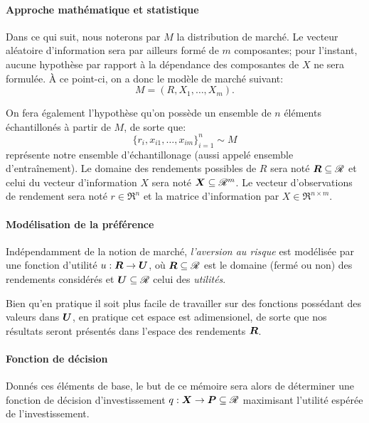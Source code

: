\paragraph{Approche mathématique et statistique}

Dans ce qui suit, nous noterons par $M$ la distribution de marché. Le vecteur aléatoire
d'information sera par ailleurs formé de $m$ composantes; pour l'instant, aucune hypothèse
par rapport à la dépendance des composantes de $X$ ne sera formulée. À ce point-ci, on a
donc le modèle de marché suivant:
\begin{equation}
  M = (R,X_1, \ldots, X_m).
\end{equation}

On fera également l'hypothèse qu'on possède un ensemble de $n$ éléments échantillonés à
partir de $M$, de sorte que:
\begin{equation}
  \{r_i, x_{i1}, \ldots, x_{im}\}_{i=1}^n \sim M
\end{equation}
représente notre ensemble d'échantillonage (aussi appelé ensemble d'entraînement). Le
domaine des rendements possibles de $R$ sera noté $\bm{R} \subseteq \mathscr{R}$ et celui du vecteur
d'information $X$ sera noté $\bm{X} \subseteq \mathscr{R}^m$. Le vecteur d'observations de rendement sera noté
$r \in \Re^n$ et la matrice d'information par $X \in \Re^{n \times m}$.



\paragraph{Modélisation de la préférence}

Indépendamment de la notion de marché, \textit{l'aversion au risque} est modélisée par une
fonction d'utilité $u:\bm{R}\to\bm{U}$, où $\bm{R} \subseteq \mathscr{R}$ est le domaine (fermé ou non) des rendements
considérés et $\bm{U} \subseteq \mathscr{R}$ celui des \textit{utilités}.

Bien qu'en pratique il soit plus facile de travailler sur des fonctions possédant des
valeurs dans $\bm{U}$, en pratique cet espace est adimensionel\cit, de sorte que nos résultats
seront présentés dans l'espace des rendements $\bm{R}$.


\paragraph{Fonction de décision}

Donnés ces éléments de base, le but de ce mémoire sera alors de déterminer une fonction de
décision d'investissement $q: \bm{X} \to \bm{P} \subseteq \mathscr{R}$ maximisant l'utilité espérée de l'investissement.

